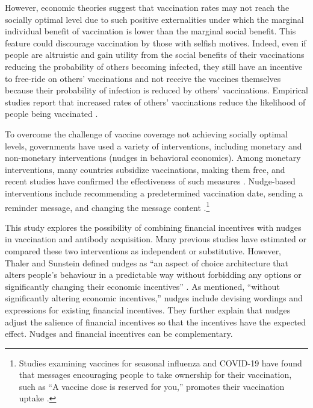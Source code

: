 \documentclass[
]{article}
\begin{document}
However, economic theories suggest that vaccination rates may not reach the socially optimal level due to such positive externalities \citep{Brito1991a, Francis1997, Stiglitz2000} under which the marginal individual benefit of vaccination is lower than the marginal social benefit. This feature could discourage vaccination by those with selfish motives. Indeed, even if people are altruistic and gain utility from the social benefits of their vaccinations reducing the probability of others becoming infected, they still have an incentive to free-ride on others' vaccinations and not receive the vaccines themselves because their probability of infection is reduced by others' vaccinations. Empirical studies report that increased rates of others' vaccinations reduce the likelihood of people being vaccinated \citep{Hershey1994, Ibuka2014}.

To overcome the challenge of vaccine coverage not achieving socially optimal levels, governments have used a variety of interventions, including monetary and non-monetary interventions (nudges in behavioral economics). Among monetary interventions, many countries subsidize vaccinations, making them free, and recent studies have confirmed the effectiveness of such measures \citep{Barber2022, Brehm2022}. Nudge-based interventions include recommending a predetermined vaccination date, sending a reminder message, and changing the message content \citep{Chapman2010, Sasaki2022, Yokum2018}.\footnote{Studies examining vaccines for seasonal influenza and COVID-19 have found that messages encouraging people to take ownership for their vaccination, such as ``A vaccine dose is reserved for you,'' promotes their vaccination uptake \citep{Dai2021, Milkman2021}.}

This study explores the possibility of combining financial incentives with nudges in vaccination and antibody acquisition. Many previous studies have estimated or compared these two interventions as independent or substitutive. However, Thaler and Sunstein defined nudges as ``an aspect of choice architecture that alters people's behaviour in a predictable way without forbidding any options or significantly changing their economic incentives'' \citep[p.6]{Thaler2009}. As mentioned, ``without significantly altering economic incentives,'' nudges include devising wordings and expressions for existing financial incentives. They further explain that nudges adjust the salience of financial incentives so that the incentives have the expected effect. Nudges and financial incentives can be complementary.
\end{document}
